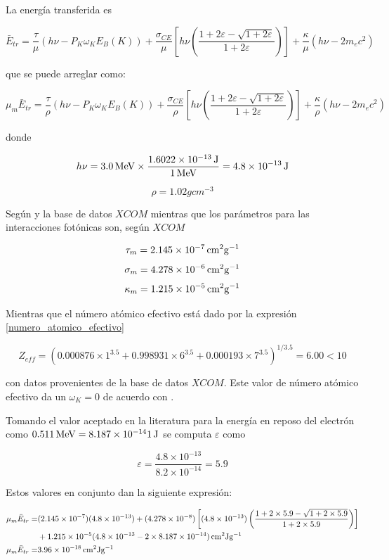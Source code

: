\documentclass[12pt,letterpaper, oneside]{book}
\begin{document}
	La energía transferida es 
	
	$$\bar{E}_{tr}=\frac{\tau}{\mu}\left(h\nu - P_K \omega_K E_B(K)\right) + \frac{\sigma_{CE}}{\mu}\left[h\nu \left(\frac{1+2\varepsilon - \sqrt{1+2\varepsilon}}{1+2\varepsilon}\right)\right] + \frac{\kappa}{\mu}\left(h\nu - 2m_ec^2\right)$$
	
	\noindent que se puede arreglar como:
	
	$$\mu_m\bar{E}_{tr}=\frac{\tau}{\rho}\left(h\nu - P_K \omega_K E_B(K)\right) + \frac{\sigma_{CE}}{\rho}\left[h\nu \left(\frac{1+2\varepsilon - \sqrt{1+2\varepsilon}}{1+2\varepsilon}\right)\right] + \frac{\kappa}{\rho}\left(h\nu - 2m_ec^2\right)$$
	
	\noindent donde 
	
	$$h\nu=\unit[3.0]{MeV} \times \frac{\unit[1.6022\times 10^{-13}]{J}}{\unit[1]{MeV}}=\unit[4.8\times 10^{-13}]{J}$$
	
	$$\rho=\unit{1.02}{gcm^{-3}}$$
	
	Según \cite{NIST.2017} y la base de datos $XCOM$ mientras que los parámetros para las interacciones fotónicas son, según $XCOM$
	
	$$\tau_m=\unit[2.145\times 10^{-7}]{cm^2g^{-1}}$$
	$$\sigma_m=\unit[4.278\times 10^{-6}]{cm^2 g^{-1}}$$
	$$\kappa_m=\unit[1.215\times 10^{-5}]{cm^2 g^{-1}}$$
	
	Mientras que el número atómico efectivo está dado por la expresión \ref{numero_atomico_efectivo}
	
	$$Z_{eff}=\left(0.000876\times 1^{3.5}+0.998931\times 6^{3.5}+0.000193\times 7^{3.5}\right)^{1/3.5}=6.00<10$$
	
	\noindent con datos provenientes de la base de datos $XCOM$. Este valor de número atómico efectivo da un $\omega_K=0$ de acuerdo con \cite{Podgorsak.2016}. 
	
	Tomando el valor aceptado en la literatura \cite{Podgorsak.2016, IAEA.2010, IAEA.2005, Mayles.2007} para la energía en reposo del electrón como $\unit[0.511]{MeV}=\unit[8.187\times 10^{-14}1]{J}$ se computa $\varepsilon$ como
	
	$$\varepsilon=\frac{4.8\times10^{-13}}{8.2\times 10^{-14}}=5.9$$
	
	Estos valores en conjunto dan la siguiente expresión:
	
	\begin{align*}
		\mu_m \bar{E}_{tr}=&(2.145\times 10^{-7})(4.8\times 10^{-13})+(4.278\times 10^{-8})\left[(4.8\times 10^{-13})\left(\frac{1+2 \times5.9-\sqrt{1+2\times 5.9}}{1+2\times 5.9}\right)\right]\\
		&+\unit[1.215\times10^{-5}(4.8\times 10^{-13} - 2\times 8.187\times 10^{-14})]{cm^2 Jg^{-1}}\\
		\mu_m \bar{E}_{tr}=&\unit[3.96\times 10^{-18}]{cm^2 Jg^{-1}}
	\end{align*}
	
\end{document}
